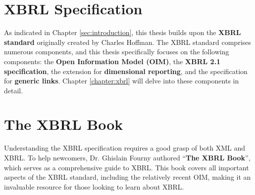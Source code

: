 \section{XBRL Specification}
As indicated in Chapter \ref{sec:introduction}, this thesis builds upon the 
\textcolor{airforceblue}{\textbf{XBRL standard}}\cite{xbrl} 
originally created by Charles Hoffman\cite{xbrl}.
The XBRL standard comprises numerous components, and this thesis specifically focuses on the following components: 
the \textcolor{airforceblue}{\textbf{Open Information Model (OIM)}}\cite{oim},
the \textcolor{airforceblue}{\textbf{XBRL 2.1 specification}}\cite{xbrl21},
the extension for \textcolor{airforceblue}{\textbf{dimensional reporting}}\cite{xbrl_dimensions},
and the specification for \textcolor{airforceblue}{\textbf{generic links}}\cite{xbrl_generic_links}.
Chapter \ref{chapter:xbrl} will delve into these components in detail.

\section{The XBRL Book}
Understanding the XBRL specification requires a good grasp of both XML and XBRL.
To help newcomers, Dr. Ghislain Fourny authored ``\textcolor{airforceblue}{\textbf{The XBRL Book}}''\cite{fourny2023xbrl},
which serves as a comprehensive guide to XBRL. This book covers all important aspects of the XBRL standard, including the relatively recent OIM, 
making it an invaluable resource for those looking to learn about XBRL.

